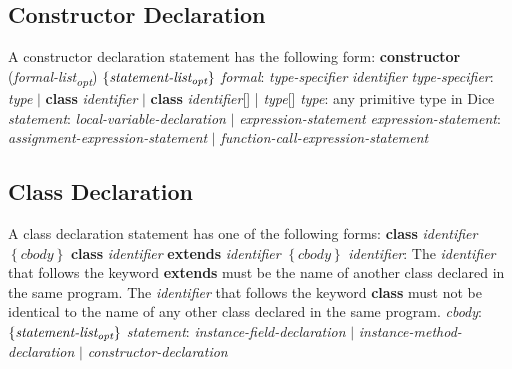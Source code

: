 \begin{homeworkProblem}
    \subsection{Constructor Declaration}
    A constructor declaration statement has the following form:
    \newline
    \textbf{constructor} (\textit{formal-list\textsubscript{opt}}) $\left\{ \textit{statement-list\textsubscript{opt}} \right\}$
    \newline
    \textit{formal}: \textit{type-specifier} \textit{identifier}
\newline
    \textit{type-specifier}: \textit{type} $|$ \textbf{class} \textit{identifier} $|$ \textbf{class} \textit{identifier}[] | \textit{type}[]
    \newline
    \textit{type}: any primitive type in Dice
    \newline
    \textit{statement}: \textit{local-variable-declaration} $|$ \textit{expression-statement}
    \newline
    \textit{expression-statement}: \textit{assignment-expression-statement} $|$ \textit{function-call-expression-statement}

    \subsection{Class Declaration}
    A class declaration statement has one of the following forms:
    \newline
    \textbf{class} \textit{identifier} $\left\{ \textit{cbody} \right\}$
    \newline
    \textbf{class} \textit{identifier} \textbf{extends} \textit{identifier} $\left\{ \textit{cbody} \right\}$
    \newline
    \textit{identifier}: The \textit{identifier} that follows the keyword \textbf{extends} must be the name of another class declared in the same program. The \textit{identifier} that follows the keyword \textbf{class} must not be identical to the name of any other class declared in the same program.
    \newline
    \textit{cbody}: $\left\{ \textit{statement-list\textsubscript{opt}} \right\}$
    \newline
    \textit{statement}: \textit{instance-field-declaration} $|$ \textit{instance-method-declaration} $|$ \textit{constructor-declaration}
	
\end{homeworkProblem}
